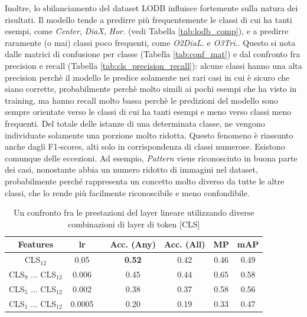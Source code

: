 Inoltre, lo sbilanciamento del dataset LODB influisce fortemente sulla natura dei risultati. Il modello tende a predirre più frequentemente le classi di cui ha tanti esempi, come \textit{Center}, \textit{DiaX}, \textit{Hor.} (vedi Tabella \ref{tab:lodb_comp}), e a predirre raramente (o mai) classi poco frequenti, come \textit{O2DiaL.} e \textit{O3Tri.}. Questo si nota dalle matrici di confusione per classe (Tabella \ref{tab:conf_mat}) e dal confronto fra precision e recall (Tabella \ref{tab:cls_precision_recall}): alcune classi hanno una alta precision perchè il modello le predice solamente nei rari casi in cui è sicuro che siano corrette, probabilmente perchè molto simili ai pochi esempi che ha visto in training, ma hanno recall molto bassa perchè le predizioni del modello sono sempre orientate verso le classi di cui ha tanti esempi e meno verso classi meno frequenti. Del totale delle istanze di una determinata classe, ne vengono individuate solamente una porzione molto ridotta. Questo fenomeno è riassunto anche dagli F1-scores, alti solo in corrispondenza di classi numerose. Esistono comunque delle eccezioni. Ad esempio, \textit{Pattern} viene riconosciuto in buona parte dei casi, nonostante abbia un numero ridotto di immagini nel dataset, probabilmente perché rappresenta un concetto molto diverso da tutte le altre classi, che lo rende più facilmente riconoscibile e meno confondibile.


\vspace{5mm}
\begin{table}[h]
    \centering
    \setlength{\tabcolsep}{5pt} %
    \renewcommand{\arraystretch}{1.6} %
    \begin{tabular}{c|c|ccccc}
        \hline
         Features & lr & & \textbf{Acc. (Any)} & \textbf{Acc. (All)} & \textbf{MP} & \textbf{mAP} \\
         \hline
         CLS$_{12}$ & 0.05 & & \textbf{0.52} & 0.42 & 0.46 & 0.49 \\
         CLS$_{9}$ ... CLS$_{12}$ & 0.006 & & 0.45 & 0.44 & 0.65 & 0.58 \\
         CLS$_{5}$ ... CLS$_{12}$ & 0.002 & & 0.38 & 0.37 & 0.58 & 0.56 \\
         CLS$_{1}$ ... CLS$_{12}$ & 0.0005 & & 0.20 & 0.19 & 0.33 & 0.47 \\
         \hline
    \end{tabular}
    \caption{Un confronto fra le prestazioni del layer lineare utilizzando diverse combinazioni di layer di token [CLS]}
    \label{tab:cls_prove}
\end{table}

